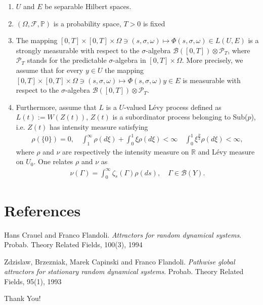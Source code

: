 \documentclass[xcolor=dvipsnames,leqno]{beamer}
\newcommand{\R}{\mathbb{R}}
\renewcommand{\P}{\mathbb{P}}
\begin{document}
\begin{frame}
\begin{enumerate}
	\item $U$  and $E$ be separable Hilbert spaces.
	\item $(\Omega,\mathcal{F},\P)$ is a probability space, $T>0$ is fixed
	\item The mapping $[0,T]\times[0,T]\times\Omega\ni (s,\sigma,\omega)\mapsto \Phi(s,\sigma,\omega)\in L(U,E)$ is a strongly measurable with respect to the $\sigma$-algebra $\mathcal B([0,T])\otimes\mathcal P_T$, where $\mathcal P_T$ stands for the predictable $\sigma$-algebra in $[0,T]\times\Omega$. More precisely, we assume that for every $y\in U$ the mapping $[0,T]\times[0,T]\times\Omega\ni (s,\sigma,\omega)\mapsto \Phi(s,\sigma,\omega)y\in E$ is measurable with respect to the $\sigma$-algebra $\mathcal B([0,T])\otimes\mathcal P_T$. 
	\item Furthermore, assume that $L$ is a $U$-valued L\'evy process defined as $L(t):=W(Z(t))$, $Z(t)$ is a subordinator process belonging to Sub($p$), i.e. $Z(t)$ has intensity measure satisfying
	\begin{align*}
	\rho(\{0\})=0,\quad\int_1^{\infty}\rho(d\xi)+\int_0^1\xi\rho(d\xi)<\infty\quad	\int_0^1\xi^{\frac{p}{2}}\rho(d\xi)<\infty,
	\end{align*}
	where $\rho$ and $\nu$ are respectively the intensity measure on $\R$ and L\'evy measure on $U_0$. One relates $\rho$ and $\nu$ as
	\begin{align*}
	\nu(\Gamma)=\int_0^{\infty}\zeta_s(\Gamma)\rho(ds),\quad\Gamma\in\mathcal{B}(Y).
	\end{align*}
\end{enumerate}

\end{frame}
\section{References}

\begin{thebibliography}{9}
Hans Crauel and Franco Flandoli.
\textit{Attractors for random dynamical systems}. 
Probab. Theory Related Fields, 100(3), 1994


Zdzislaw, Brzezniak, Marek Capinski and Franco Flandoli.
\textit{Pathwise global attractors for stationary random dynamical systems}. 
Probab. Theory Related Fields, 95(1), 1993

\end{thebibliography}

\begin{center}
\Huge {\color{Plum}Thank You!}
\end{center}
\end{document}
